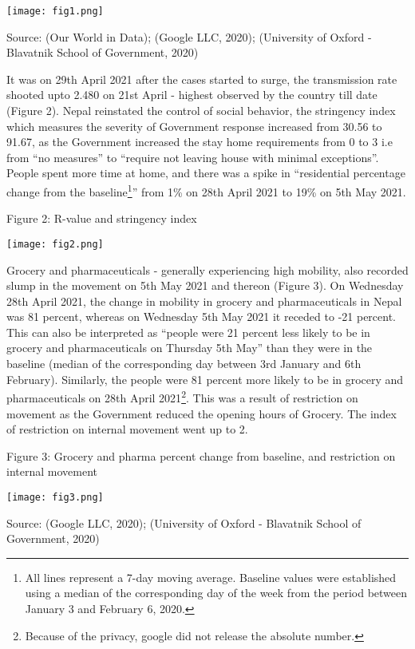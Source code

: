 \documentclass{article}
\begin{document}
\texttt{[image: fig1.png]}

\textcolor{black!65}{Source: (Our World in Data); (Google LLC, 2020); (University of Oxford - Blavatnik School of Government, 2020)}

\pagebreak

It was on 29th April 2021 after the cases started to surge, the transmission rate shooted upto 2.480 on 21st April - highest observed by the country till date (Figure 2). Nepal reinstated the control of social behavior, the stringency index which measures the severity of Government response increased from 30.56 to 91.67, as the Government increased the stay home requirements from 0 to 3 i.e from “no measures” to “require not leaving house with minimal exceptions”. People spent more time at home, and there was a spike in “residential percentage change from the baseline\footnote{All lines represent a 7-day moving average. Baseline values were established using a median of the corresponding day of the week from the period between January 3 and February 6, 2020.}” from 1\% on 28th April 2021 to 19\% on 5th May 2021.

\textcolor{black!65}{Figure 2: R-value and stringency index}

\texttt{[image: fig2.png]}

\pagebreak

Grocery and pharmaceuticals - generally experiencing high mobility, also  recorded slump in the movement on 5th May 2021 and thereon (Figure 3). On Wednesday 28th  April  2021, the change in mobility in grocery and pharmaceuticals in Nepal was 81 percent, whereas on Wednesday 5th May 2021 it receded to -21 percent. This can also be interpreted as “people were 21 percent less likely to be in grocery and pharmaceuticals on Thursday 5th  May” than they were in the baseline (median of the corresponding day between 3rd January and 6th February). Similarly, the people were 81 percent more likely to be in grocery and pharmaceuticals on 28th April 2021\footnote{Because of the privacy, google did not release the absolute number.}. This was a result of restriction on movement as the Government reduced the opening hours of Grocery. The index of restriction on internal movement went up to 2. 

\textcolor{black!65}{Figure 3: Grocery and pharma percent change from baseline, and restriction on internal movement}

\texttt{[image: fig3.png]}

\textcolor{black!65}{Source: (Google LLC, 2020)\cite{Google_mobility}; (University of Oxford - Blavatnik School of Government, 2020)}
\end{document}
